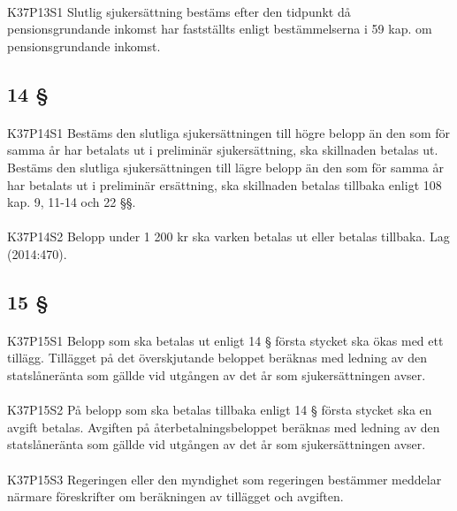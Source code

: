 \documentclass[a4paper,notitlepage,openany,10pt]{book}
\begin{document}
\paragraph*{}
{\tiny K37P13S1}
Slutlig sjukersättning bestäms efter den tidpunkt då pensionsgrundande inkomst har fastställts enligt bestämmelserna i 59 kap. om pensionsgrundande inkomst.
\subsection*{14 §}
\paragraph*{}
{\tiny K37P14S1}
Bestäms den slutliga sjukersättningen till högre belopp än den som för samma år har betalats ut i preliminär sjukersättning, ska skillnaden betalas ut. Bestäms den slutliga sjukersättningen till lägre belopp än den som för samma år har betalats ut i preliminär ersättning, ska skillnaden betalas tillbaka enligt 108 kap. 9, 11-14 och 22 §§.
\paragraph*{}
{\tiny K37P14S2}
Belopp under 1 200 kr ska varken betalas ut eller betalas tillbaka.
Lag (2014:470).
\subsection*{15 §}
\paragraph*{}
{\tiny K37P15S1}
Belopp som ska betalas ut enligt 14 § första stycket ska ökas med ett tillägg. Tillägget på det överskjutande beloppet beräknas med ledning av den statslåneränta som gällde vid utgången av det år som sjukersättningen avser.
\paragraph*{}
{\tiny K37P15S2}
På belopp som ska betalas tillbaka enligt 14 § första stycket ska en avgift betalas. Avgiften på återbetalningsbeloppet beräknas med ledning av den statslåneränta som gällde vid utgången av det år som sjukersättningen avser.
\paragraph*{}
{\tiny K37P15S3}
Regeringen eller den myndighet som regeringen bestämmer meddelar närmare föreskrifter om beräkningen av tillägget och avgiften.
\end{document}
